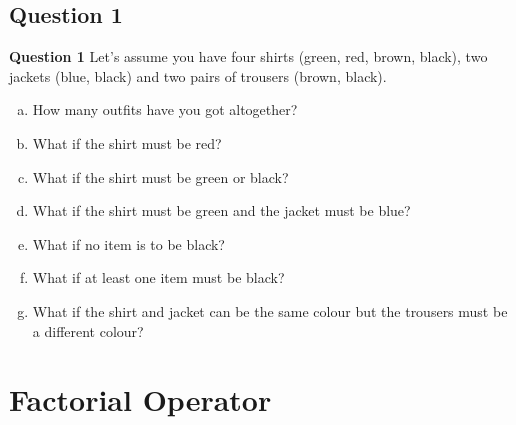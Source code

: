 \documentclass[compress]{beamer}        %
\makeatletter
\newcommand{\tcb}{\textcolor{beamer@blendedblue}}
\makeatother
\begin{document}
\subsection{Question 1}
\begin{frame}{\bf \tcb{Question 1}}
Let's assume you have four shirts (green, red, brown, black), two jackets (blue, black) and two pairs of trousers (brown, black).\\[0.3cm]
\begin{enumerate}[a)]\itemsep0.3cm
\item How many outfits have you got altogether?
\item What if the shirt must be red?
\item What if the shirt must be green or black?
\item What if the shirt must be green and the jacket must be blue?
\item What if no item is to be black?
\item What if at least one item must be black?
\item What if the shirt and jacket can be the same colour but the trousers must be a different colour?
\end{enumerate}

\end{frame}



\section{Factorial Operator}
\end{document}
